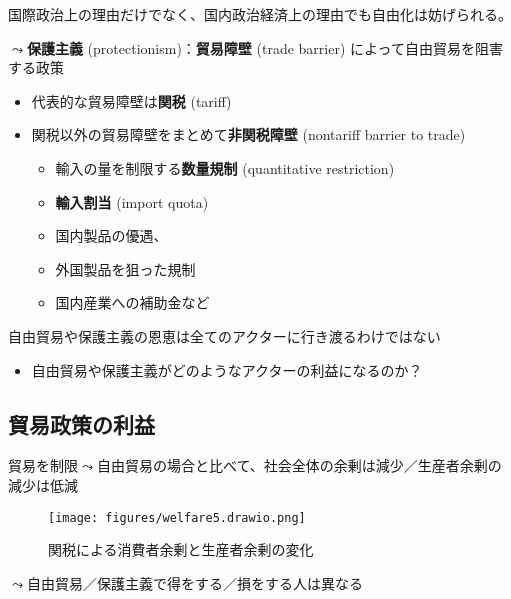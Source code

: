 \documentclass[
  xelatex,
  ja=standard]{bxjsarticle}
\providecommand{\tightlist}{%
  \setlength{\itemsep}{0pt}\setlength{\parskip}{0pt}}\usepackage{longtable,booktabs,array}
\begin{document}
国際政治上の理由だけでなく、国内政治経済上の理由でも自由化は妨げられる。

\(\leadsto\)\textbf{保護主義} (protectionism)：\textbf{貿易障壁} (trade
barrier) によって自由貿易を阻害する政策

\begin{itemize}
\tightlist
\item
  代表的な貿易障壁は\textbf{関税} (tariff)
\item
  関税以外の貿易障壁をまとめて\textbf{非関税障壁} (nontariff barrier to
  trade)

  \begin{itemize}
  \tightlist
  \item
    輸入の量を制限する\textbf{数量規制} (quantitative restriction)
  \item
    \textbf{輸入割当} (import quota)
  \item
    国内製品の優遇、
  \item
    外国製品を狙った規制
  \item
    国内産業への補助金など
  \end{itemize}
\end{itemize}

自由貿易や保護主義の恩恵は全てのアクターに行き渡るわけではない

\begin{itemize}
\tightlist
\item
  自由貿易や保護主義がどのようなアクターの利益になるのか？
\end{itemize}

\hypertarget{ux8cbfux6613ux653fux7b56ux306eux5229ux76ca}{%
\subsection{貿易政策の利益}\label{ux8cbfux6613ux653fux7b56ux306eux5229ux76ca}}

貿易を制限\(\leadsto\)自由貿易の場合と比べて、社会全体の余剰は減少／生産者余剰の減少は低減

\begin{figure}[htpb]

{\centering \texttt{[image: figures/welfare5.drawio.png]}

}

\caption{関税による消費者余剰と生産者余剰の変化}

\end{figure}

\(\leadsto\)自由貿易／保護主義で得をする／損をする人は異なる
\end{document}
